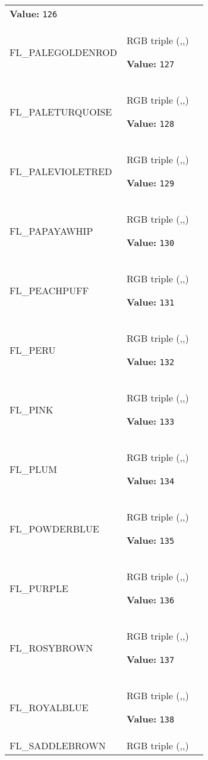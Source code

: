 \begin{longtable}{|p{\varnamewidth}|p{\vardescrwidth}|l}
\textbf{Value:} 
{\tt 126}&\\
\cline{1-2}
\raggedright F\-L\-\_\-P\-A\-L\-E\-G\-O\-L\-D\-E\-N\-R\-O\-D\- & \raggedright RGB triple (,,)

\textbf{Value:} 
{\tt 127}&\\
\cline{1-2}
\raggedright F\-L\-\_\-P\-A\-L\-E\-T\-U\-R\-Q\-U\-O\-I\-S\-E\- & \raggedright RGB triple (,,)

\textbf{Value:} 
{\tt 128}&\\
\cline{1-2}
\raggedright F\-L\-\_\-P\-A\-L\-E\-V\-I\-O\-L\-E\-T\-R\-E\-D\- & \raggedright RGB triple (,,)

\textbf{Value:} 
{\tt 129}&\\
\cline{1-2}
\raggedright F\-L\-\_\-P\-A\-P\-A\-Y\-A\-W\-H\-I\-P\- & \raggedright RGB triple (,,)

\textbf{Value:} 
{\tt 130}&\\
\cline{1-2}
\raggedright F\-L\-\_\-P\-E\-A\-C\-H\-P\-U\-F\-F\- & \raggedright RGB triple (,,)

\textbf{Value:} 
{\tt 131}&\\
\cline{1-2}
\raggedright F\-L\-\_\-P\-E\-R\-U\- & \raggedright RGB triple (,,)

\textbf{Value:} 
{\tt 132}&\\
\cline{1-2}
\raggedright F\-L\-\_\-P\-I\-N\-K\- & \raggedright RGB triple (,,)

\textbf{Value:} 
{\tt 133}&\\
\cline{1-2}
\raggedright F\-L\-\_\-P\-L\-U\-M\- & \raggedright RGB triple (,,)

\textbf{Value:} 
{\tt 134}&\\
\cline{1-2}
\raggedright F\-L\-\_\-P\-O\-W\-D\-E\-R\-B\-L\-U\-E\- & \raggedright RGB triple (,,)

\textbf{Value:} 
{\tt 135}&\\
\cline{1-2}
\raggedright F\-L\-\_\-P\-U\-R\-P\-L\-E\- & \raggedright RGB triple (,,)

\textbf{Value:} 
{\tt 136}&\\
\cline{1-2}
\raggedright F\-L\-\_\-R\-O\-S\-Y\-B\-R\-O\-W\-N\- & \raggedright RGB triple (,,)

\textbf{Value:} 
{\tt 137}&\\
\cline{1-2}
\raggedright F\-L\-\_\-R\-O\-Y\-A\-L\-B\-L\-U\-E\- & \raggedright RGB triple (,,)

\textbf{Value:} 
{\tt 138}&\\
\cline{1-2}
\raggedright F\-L\-\_\-S\-A\-D\-D\-L\-E\-B\-R\-O\-W\-N\- & \raggedright RGB triple (,,)


\end{longtable}

